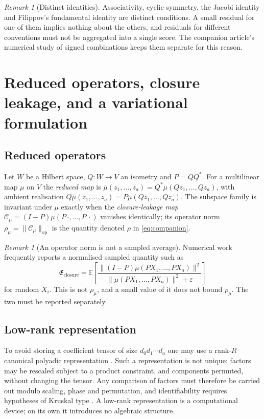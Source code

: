 \documentclass[11pt]{amsart}
\theoremstyle{definition}
\theoremstyle{remark}
\newtheorem{remark}[theorem]{Remark}
\newcommand{\op}{\mathrm{op}}
\newcommand{\norm}[1]{\lVert#1\rVert}
\newcommand{\Energy}{\mathfrak E}
\begin{document}
\begin{remark}[Distinct identities]
\label{rem:identities}
Associativity, cyclic symmetry, the Jacobi identity and Filippov's fundamental identity
\cite{Filippov1985} are distinct conditions. A small residual for one of them implies
nothing about the others, and residuals for different conventions must not be aggregated
into a single score. The companion article's numerical study of signed combinations
\cite{ChaveroJassoTrees} keeps them separate for this reason.
\end{remark}

\section{Reduced operators, closure leakage, and a variational formulation}
\label{sec:variational}

\subsection{Reduced operators}

Let $W$ be a Hilbert space, $Q:W\to V$ an isometry and $P=QQ^{*}$. For a multilinear map
$\mu$ on $V$ the \emph{reduced map} is
$\bar\mu(z_1,\ldots,z_a)=Q^{*}\mu(Qz_1,\ldots,Qz_a)$, with ambient realisation
$Q\bar\mu(z_1,\ldots,z_a)=P\mu(Qz_1,\ldots,Qz_a)$. The subspace family is invariant under
$\mu$ exactly when the \emph{closure-leakage map}
$\mathcal C_\mu=(I-P)\mu(P\,\cdot,\ldots,P\,\cdot)$ vanishes identically; its operator
norm $\rho_\mu=\norm{\mathcal C_\mu}_{\op}$ is the quantity denoted $\rho$ in
\eqref{eq:companion}.

\begin{remark}[An operator norm is not a sampled average]
\label{rem:sampled}
Numerical work frequently reports a normalised sampled quantity such as
\[
 \Energy_{\mathrm{closure}}
 =\mathbb E\left[
 \frac{\norm{(I-P)\mu(PX_1,\ldots,PX_a)}^{2}}
 {\norm{\mu(PX_1,\ldots,PX_a)}^{2}+\varepsilon}\right]
\]
for random $X_i$. This is not $\rho_\mu$, and a small value of it does not bound
$\rho_\mu$. The two must be reported separately.
\end{remark}

\subsection{Low-rank representation}

To avoid storing a coefficient tensor of size $d_0d_1\cdots d_a$ one may use a rank-$R$
canonical polyadic representation \cite{KoldaBader2009}. Such a representation is not
unique: factors may be rescaled subject to a product constraint, and components permuted,
without changing the tensor. Any comparison of factors must therefore be carried out
modulo scaling, phase and permutation, and identifiability requires hypotheses of Kruskal
type \cite{Kruskal1977}. A low-rank representation is a computational device; on its own
it introduces no algebraic structure.
\end{document}
